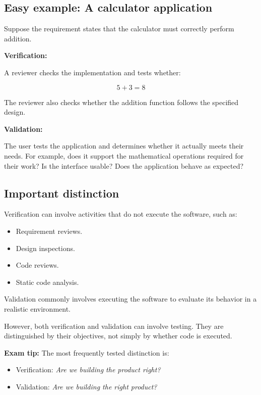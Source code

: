 \subsection{Easy example: A calculator application}

Suppose the requirement states that the calculator must correctly perform addition.

\textbf{Verification:}

A reviewer checks the implementation and tests whether:



\[
5+3=8
\]



The reviewer also checks whether the addition function follows the specified design.

\textbf{Validation:}

The user tests the application and determines whether it actually meets their needs. For example, does it support the mathematical operations required for their work? Is the interface usable? Does the application behave as expected?

\subsection{Important distinction}

Verification can involve activities that do not execute the software, such as:

\begin{itemize}
\item Requirement reviews.
\item Design inspections.
\item Code reviews.
\item Static code analysis.
\end{itemize}

Validation commonly involves executing the software to evaluate its behavior in a realistic environment.

However, both verification and validation can involve testing. They are distinguished by their objectives, not simply by whether code is executed.

\textbf{Exam tip:} The most frequently tested distinction is:

\begin{itemize}
\item Verification: \textit{Are we building the product right?}
\item Validation: \textit{Are we building the right product?}
\end{itemize}


